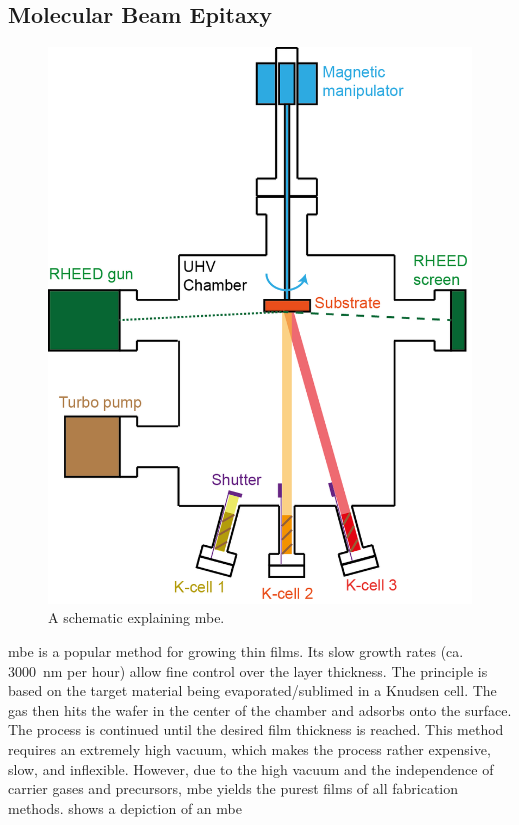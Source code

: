 \subsection{Molecular Beam Epitaxy} 
\begin{figure}
    \centering
    \includegraphics[scale=.7]{03_fabrication/fig/molecular_beam_epitaxy.png}
    \caption{A schematic explaining \gls{mbe}. \cite{Zeljkovic2015}}
    \label{fig:fabrication_mbe}
\end{figure}
\Gls{mbe} is a popular method for growing thin films. Its slow growth rates (ca. \SI{3000}{\nano\meter} per hour) allow fine control over the layer thickness. The principle is based on the target material being evaporated/sublimed in a Knudsen cell. The gas then hits the wafer in the center of the chamber and adsorbs onto the surface. The process is continued until the desired film thickness is reached. This method requires an extremely high vacuum, which makes the process rather expensive, slow, and inflexible.  However, due to the high vacuum and the independence of carrier gases and precursors, \gls{mbe} yields the purest films of all fabrication methods.  shows a depiction of an \gls{mbe} 
